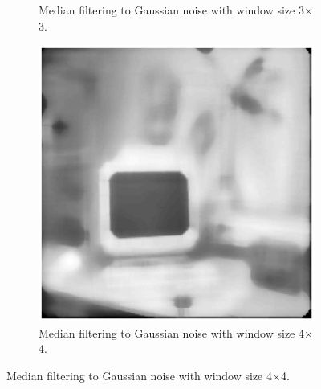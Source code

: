 \documentclass[11pt,a4paper]{article}
\begin{document}
\begin{itemize}
\begin{figure}[!ht]
\begin{subfigure}[t]{.32\linewidth}
			\caption{\scriptsize Median filtering to Gaussian noise with window size 3$\times$3.}
			\label{fig:medToGauss3*3}
		\end{subfigure}
		\begin{subfigure}[t]{.32\linewidth} %
			\includegraphics[width=\columnwidth]{Q17_Med_to_Gauss_4_4.eps}
			\caption{\scriptsize Median filtering to Gaussian noise with window size 4$\times$4.}
			\label{fig:medToGauss4*4}
		\end{subfigure}


\end{figure}
\end{itemize}
\end{document}
